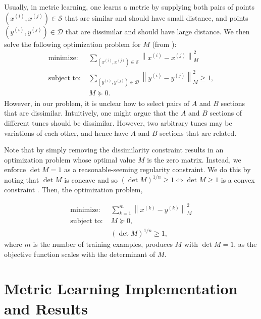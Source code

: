\documentclass{article} %
\newcommand{\xip}{x^{(i)}}
\newcommand{\xjp}{x^{(j)}}
\newcommand{\yip}{y^{(i)}}
\newcommand{\yjp}{y^{(j)}}
\newcommand{\vectornorm}[1]{\left\| #1 \right\|}
\begin{document}
Usually, in metric learning, one learns a metric by supplying both pairs of
points $(\xip, \xjp) \in \mathcal{S}$ that are similar and should have small
distance, and points $(\yip, \yjp) \in \mathcal{D}$ that are dissimilar and
should have large distance. We then solve the following optimization problem for
$M$ (from \cite{metricNg}):
\begin{align*} 
\text{minimize: } &
\sum_{(x^{(i)}, x^{(j)}) \in \mathcal S} \vectornorm{x^{(i)} - x^{(j)}}_M^2 \\
\text{subject to: }
& \sum_{(y^{(i)}, y^{(j)}) \in \mathcal D}
	\vectornorm{y^{(i)} - y^{(j)}}_M^2 \ge 1, \\
& M \succeq 0.
\end{align*} 
However, in our problem, it is unclear how to select pairs of $A$ and $B$
sections that are dissimilar. Intuitively, one might argue that the $A$ and $B$
sections of different tunes should be dissimilar. However, two arbitrary tunes
may be variations of each other, and hence have $A$ and $B$ sections that are
related.

Note that by simply removing the dissimilarity constraint results in an
optimization problem whose optimal value $M$ is the zero matrix. Instead, we
enforce $\det M = 1$ as a reasonable-seeming regularity constraint. We do this
by noting that $\det M$ is concave and so 
$(\det M)^{1/n} \ge 1 \Leftrightarrow \det M \geq 1$ is a
convex constraint \cite{boyd}. Then, the optimization problem,

\begin{align*} 
\text{minimize: } & \sum_{k=1}^m \vectornorm{x^{(k)} - y^{(k)}}_M^2 \\
\text{subject to: }
& M \succeq 0, \\
& (\det M)^{1/n} \ge 1,
\end{align*} 
where $m$ is the number of training examples, produces $M$ with $\det M = 1$, as
the objective function scales with the determinant of $M$.

\section{Metric Learning Implementation and Results}
\end{document}
